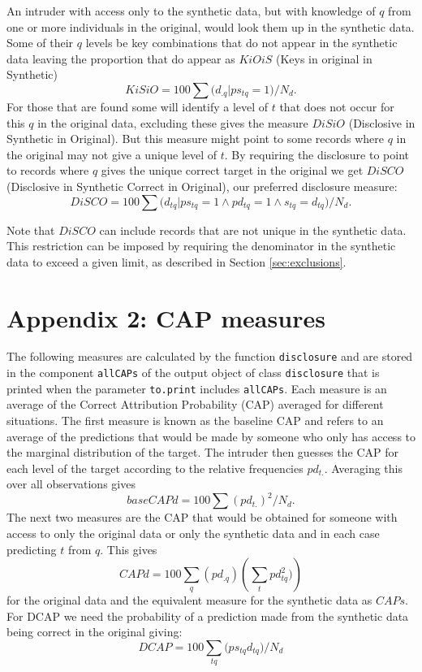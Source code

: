 \documentclass[12pt]{article}
\begin{document}
An intruder with access only to the synthetic data, but with knowledge  of $q$ from one or more individuals in the original, would look them up in the synthetic data. Some of their $q$ levels be key combinations that do not appear in the synthetic data
leaving the proportion that do appear as $KiOiS$ (Keys in original in Synthetic) 
\begin{equation}
  KiSiO = 100\sum{(d_{.q} |ps_{tq} = 1})/N_d.
\end{equation}
For those that are found some will identify a level of $t$ that does not occur for 
this $q$ in the original data, excluding these gives the measure $DiSiO$ (Disclosive in Synthetic in Original). But this measure might point to some records where $q$ in the original may not give a unique level of $t$. By requiring the disclosure to point to records where $q$ gives the unique correct target in the original we get $DiSCO$ (Disclosive in Synthetic Correct in Original), our preferred disclosure measure:
\begin{equation}
 DiSCO = 100\sum{(d_{tq} |ps_{tq} = 1 \land pd_{tq} = 1 \land s_{tq} = d_{tq}})/N_d.
\end{equation}

Note that $DiSCO$ can include records that are not unique in the synthetic data. This restriction can be imposed by requiring the denominator in the synthetic data to exceed a given limit, as described in Section \ref{sec:exclusions}.

\section*{Appendix 2: CAP measures }{\label{sec:app2}}
The following measures are calculated by the function \texttt{disclosure} and are stored in the component \texttt{allCAPs} of the output object of class \texttt{disclosure} that is printed when the parameter \texttt{to.print} includes \texttt{allCAPs}. Each measure is an average of the Correct Attribution Probability (CAP) averaged for different situations. The first measure is known as the baseline CAP and refers to an average of the predictions that would be made by someone who only has access to the marginal distribution of the target. The intruder then guesses the CAP for each level of the target according to the relative frequencies $pd_{t.}$. Averaging this over all observations gives
\begin{equation}
   \nonumber  baseCAPd = 100\sum{(pd_{t.})^2}/N_d.
\end{equation}
The next two measures are the CAP that would be obtained for someone with access to only the original data or only the synthetic data and in each case predicting $t$ from $q$. This gives
\begin{equation}
   \nonumber  CAPd = 100\sum\limits_q{(pd_{.q})}(\sum\limits_t{pd_{tq}^2)})
\end{equation}
for the original data and the equivalent measure for the synthetic data as $CAPs$. 
For DCAP we need the probability of a prediction made from the synthetic data being correct in the original giving:
\begin{equation}
   \nonumber  DCAP = 100\sum\limits_{tq}{(ps_{tq}}d_{tq})/N_d
\end{equation}
\end{document}
